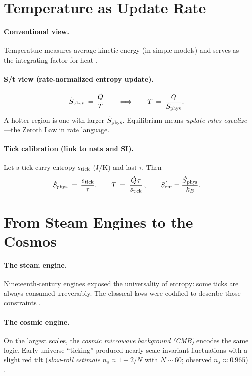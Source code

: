 \documentclass[11pt,oneside]{article}
\begin{document}
\section{Temperature as Update Rate}

\paragraph{Conventional view.}
Temperature measures average kinetic energy (in simple models) and serves as the integrating factor for heat \cite{boltzmann1872,callen1985thermodynamics}.

\paragraph{S/t view (rate-normalized entropy update).}
\[
\dot{S}_{\mathrm{phys}} \;=\; \frac{\dot Q}{T}
\qquad\Longleftrightarrow\qquad
T \;=\; \frac{\dot Q}{\dot{S}_{\mathrm{phys}}}.
\]
A hotter region is one with larger \(\dot{S}_{\mathrm{phys}}\).
Equilibrium means \emph{update rates equalize}—the Zeroth Law in rate language.

\paragraph{Tick calibration (link to nats and SI).}
Let a tick carry entropy \(s_{\rm tick}\) (J/K) and last \(\tau\). Then
\[
\dot{S}_{\mathrm{phys}} \;=\; \frac{s_{\rm tick}}{\tau},
\qquad
T \;=\; \frac{\dot Q\,\tau}{s_{\rm tick}}\,,
\qquad
\dot{S_{\mathrm{ent}}}=\frac{\dot{S}_{\mathrm{phys}}}{k_B}.
\]

\section{From Steam Engines to the Cosmos}

\paragraph{The steam engine.}
Nineteenth-century engines exposed the universality of entropy: some ticks are always consumed irreversibly. The classical laws were codified to describe those constraints \cite{clausius1879mechanical,callen1985thermodynamics}.

\paragraph{The cosmic engine.}
On the largest scales, the \emph{cosmic microwave background (CMB)} encodes the same logic. Early-universe ``ticking'' produced nearly scale-invariant fluctuations with a slight red tilt (\emph{slow-roll estimate} \(n_s\!\approx\!1-2/N\) with \(N\!\sim\!60\); observed \(n_s\!\approx\!0.965\)) \cite{peebles1993principles,planck2018params}.
\end{document}
